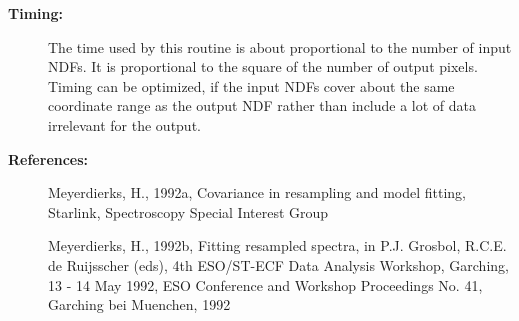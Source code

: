 \begin{description}
\item [{\bf Timing:}]
   The time used by this routine is about proportional to the number
   of input NDFs. It is proportional to the square of the number of
   output pixels. Timing can be optimized, if the input NDFs cover
   about the same coordinate range as the output NDF rather than
   include a lot of data irrelevant for the output.

\item [{\bf References:}]
   Meyerdierks, H., 1992a, Covariance in resampling and model fitting,
   Starlink, Spectroscopy Special Interest Group

   Meyerdierks, H., 1992b, Fitting resampled spectra, in P.J.
   Grosbol, R.C.E. de Ruijsscher (eds), 4th ESO/ST-ECF Data Analysis
   Workshop, Garching, 13 - 14 May 1992, ESO Conference and Workshop
   Proceedings No. 41, Garching bei Muenchen, 1992

\end{description}
